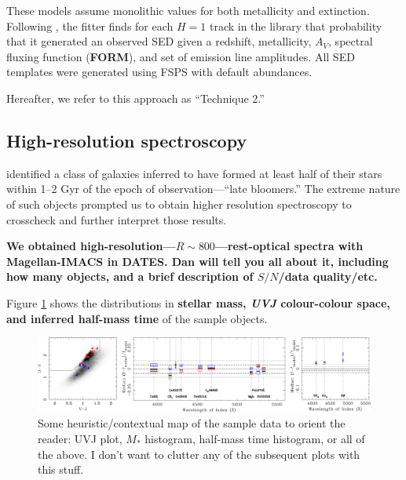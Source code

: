 \documentclass[a4paper,fleqn,usenatbib]{mnras}
\newcommand{\Mstel}{M_\ast}
\newcommand{\bfr}{\bf\color{red}}
\newcommand{\bfb}{\color{myblue}}
\newcommand{\tobs}{t_{\rm obs}}
\begin{document}
These models assume monolithic values for both metallicity and extinction. Following 
\citealt{Pacifici12}, the fitter finds for each $H=1$ track in the library that probability that it generated
an observed SED given a redshift, metallicity, $A_{V}$, spectral fluxing function ({\bfr FORM}), and 
set of emission line amplitudes. All SED templates were generated using FSPS with default abundances.

Hereafter, we refer to this approach as ``Technique 2.''

\subsection{High-resolution spectroscopy}
\label{sec: hiRes}

\citet{Dressler16, Dressler18} identified a class of galaxies inferred to have formed at least half of 
their stars within 1--2 Gyr of the epoch of observation---``late bloomers.'' The extreme nature of such objects
prompted us to obtain higher resolution spectroscopy to crosscheck and further interpret those results. 

{\bfr We obtained high-resolution---$R\sim800$---rest-optical spectra with Magellan-IMACS in DATES. 
Dan will tell you all about it, including how many objects, and a brief description of $S/N$/data quality/etc.}

Figure \ref{fig:sample} shows the distributions in {\bfr stellar mass, {\it UVJ} colour-colour space, 
and inferred half-mass time} of the sample objects.

\begin{figure}
	\includegraphics[width=\columnwidth]{residuals}
	\caption{\bfb Some heuristic/contextual map of the sample data to orient the reader: UVJ plot, 
			$\Mstel$ histogram, half-mass time histogram, or all of the above. I don't want to 
			clutter any of the subsequent plots with this stuff.}
	\label{fig:sample}
\end{figure}

\end{document}
